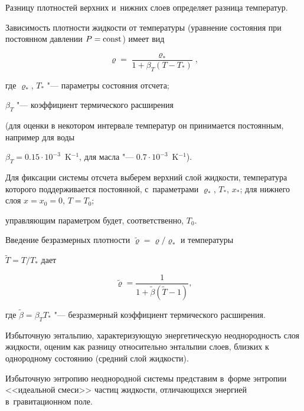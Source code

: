 Разницу плотностей верхних и~нижних слоев определяет разница температур. 

Зависимость плотности жидкости от температуры (уравнение состояния при постоянном давлении $P={\rm const}$) имеет вид

\begin{equation}

\varrho=\frac{\varrho_*}{1+\beta_T (T-T_*)} ,

\label{lukashev:N1}

\end{equation}

где $\varrho_*$, $T_*$ "--- параметры состояния отсчета; 

$\beta_T$ "--- коэффициент термического расширения 

(для оценки в некотором интервале температур он принимается постоянным, например для воды  

$\beta_T = 0.15\cdot 10^{-3}$~K$^{-1}$, для масла "--- $0.7\cdot 10^{-3}$~K$^{-1}$).

Для фиксации системы отсчета выберем верхний слой жидкости, температура которого поддерживается постоянной, с~параметрами $\varrho_*$, $T_*$, $x_*$; для нижнего слоя  $x=x_0=0$, $T=T_0$; 

управляющим параметром будет, соответственно, $T_0$.



Введение безразмерных плотности $\widetilde{\varrho}=\varrho/{\varrho_*}$ и температуры 

$\widetilde{T}={T}/{T_*}$ дает

\begin{equation}

\widetilde{\varrho}=\frac1{1+\widetilde{\beta}(\widetilde{T}-1)},\label{lukashev:N2}

\end{equation}

где $\widetilde{\beta}=\beta_T T_*$ "--- безразмерный коэффициент термического расширения.%



Избыточную энтальпию, характеризующую энергетическую неоднородность слоя жидкости, оценим как разницу относительно энтальпии слоев, близких к однородному состоянию (средний слой жидкости). 

Избыточную энтропию неоднородной системы представим в~форме энтропии <<идеальной смеси>> частиц жидкости, отличающихся энергией в~гравитационном поле. 

